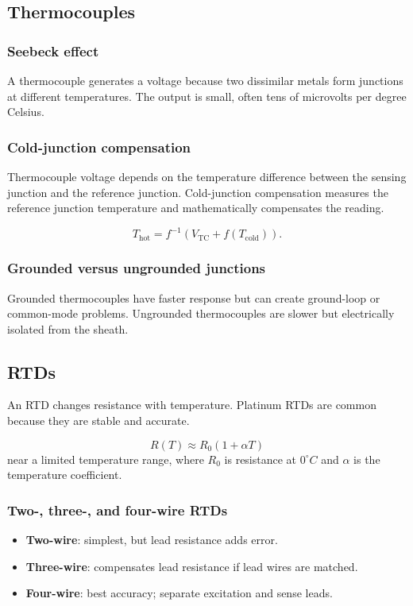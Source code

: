 \documentclass[11pt]{article}
\begin{document}
\subsection{Thermocouples}
\subsubsection{Seebeck effect}
A thermocouple generates a voltage because two dissimilar metals form junctions
at different temperatures. The output is small, often tens of microvolts per
degree Celsius.

\subsubsection{Cold-junction compensation}
Thermocouple voltage depends on the temperature difference between the sensing
junction and the reference junction. Cold-junction compensation measures the
reference junction temperature and mathematically compensates the reading.

\[
T_{\mathrm{hot}} = f^{-1}\left(V_{\mathrm{TC}} + f(T_{\mathrm{cold}})\right).
\]

\subsubsection{Grounded versus ungrounded junctions}
Grounded thermocouples have faster response but can create ground-loop or
common-mode problems. Ungrounded thermocouples are slower but electrically
isolated from the sheath.

\subsection{RTDs}
An RTD changes resistance with temperature. Platinum RTDs are common because they
are stable and accurate.

\[
R(T) \approx R_0(1+\alpha T)
\]
near a limited temperature range, where \(R_0\) is resistance at \(0^\circ C\)
and \(\alpha\) is the temperature coefficient.

\subsubsection{Two-, three-, and four-wire RTDs}
\begin{itemize}
  \item \textbf{Two-wire}: simplest, but lead resistance adds error.
  \item \textbf{Three-wire}: compensates lead resistance if lead wires are matched.
  \item \textbf{Four-wire}: best accuracy; separate excitation and sense leads.
\end{itemize}
\end{document}

